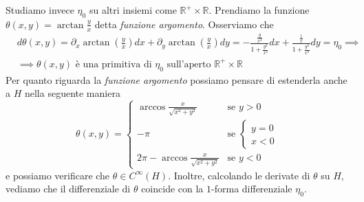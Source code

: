 \begin{remark}
$$$$ \noindent
Studiamo invece $\eta_0$ su altri insiemi come $\mathbb{R}^+ \times \mathbb{R}$. Prendiamo la funzione $\theta(x, y) = \arctan{\frac{y}{x}}$ detta \emph{funzione argomento}. Osserviamo che
\begin{align*}
&d\theta(x, y) = \partial_x \arctan{ \left( \frac{y}{x} \right) }dx + \partial_y \arctan{ \left( \frac{y}{x} \right) }dy = -\frac{\frac{y}{x^2}}{1 + \frac{y^2}{x^2}}dx + \frac{\frac{1}{x}}{1 + \frac{y^2}{x^2}}dy = \eta_0 \implies \\
&\implies \theta(x, y) \text{ è una primitiva di } \eta_0 \text{ sull'aperto } \mathbb{R}^+ \times \mathbb{R} 
\end{align*}
Per quanto riguarda la \emph{funzione argomento} possiamo pensare di estenderla anche a $H$ nella seguente maniera
\begin{equation*}
\theta(x, y) = \begin{cases}
	\arccos{\frac{x}{\sqrt{x^2 + y^2}}} & \text{se } y > 0 \\
	-\pi & \text{se } \begin{cases} y = 0 \\ x < 0 \end{cases} \\
	2 \pi - \arccos{\frac{x}{\sqrt{x^2+y^2}}} & \text{se } y < 0 
\end{cases}
\end{equation*}
e possiamo verificare che $\theta \in C^\infty(H)$. Inoltre, calcolando le derivate di $\theta$ su $H$, vediamo che il differenziale di $\theta$ coincide con la $1$-forma differenziale $\eta_0$.
\end{remark}
